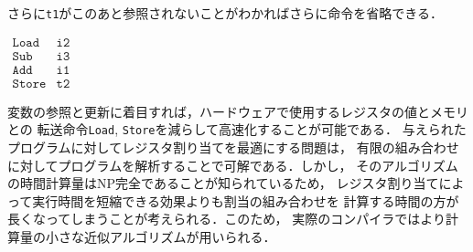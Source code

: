 \documentclass[a4j,dvipdfmx]{jbook}
\begin{document}
さらに\verb|t1|がこのあと参照されないことがわかればさらに命令を省略できる．

\begin{center}
    $\begin{array}{ll}
      \texttt{Load}  & \texttt{i2}\\
      \texttt{Sub}   & \texttt{i3}\\
      \texttt{Add} & \texttt{i1}\\
      \texttt{Store} & \texttt{t2}
    \end{array}$
\end{center}

変数の参照と更新に着目すれば，ハードウェアで使用するレジスタの値とメモリとの
転送命令\verb|Load|, \verb|Store|を減らして高速化することが可能である．
与えられたプログラムに対してレジスタ割り当てを最適にする問題は，
有限の組み合わせに対してプログラムを解析することで可解である．しかし，
そのアルゴリズムの時間計算量はNP完全であることが知られているため，
レジスタ割り当てによって実行時間を短縮できる効果よりも割当の組み合わせを
計算する時間の方が長くなってしまうことが考えられる．このため，
実際のコンパイラではより計算量の小さな近似アルゴリズムが用いられる．
\end{document}
